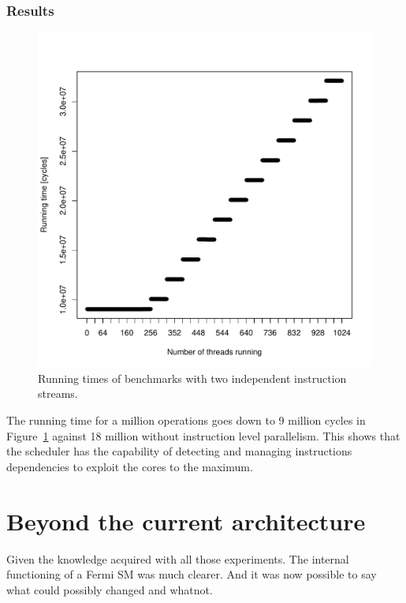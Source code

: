 \documentclass{report}
\def \scalingfactor{.8}
\begin{document}
    \subsection{Results}
    \begin{figure}[H]
		\centering
        \includegraphics[width=\scalingfactor\linewidth]{"graphics/ilp_graph"}
		\vspace{-15pt}
		\captionsetup{justification=centering}
        \caption{Running times of benchmarks with two independent instruction streams.}
        \label{fig:ilp_results}
    \end{figure}

    The running time for a million operations goes down to 9 million cycles in Figure~\ref{fig:ilp_results}
    against 18 million without instruction level parallelism. This shows that the scheduler has the
    capability of detecting and managing instructions dependencies to exploit the cores to the maximum.
    
\chapter{Beyond the current architecture}
    Given the knowledge acquired with all those experiments. The internal functioning of a Fermi SM was much clearer. And it was now possible to say what could possibly changed and whatnot.
\end{document}
